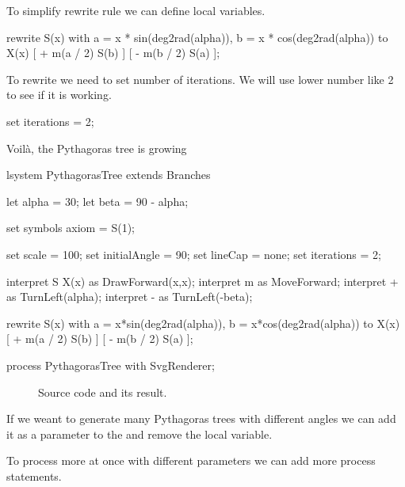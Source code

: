 To simplify rewrite rule we can define local variables.

\begin{Lsystem}
rewrite S(x)
	with a = x * sin(deg2rad(alpha)), b = x * cos(deg2rad(alpha))
	to X(x) [ + m(a / 2) S(b) ] [ - m(b / 2) S(a) ];
\end{Lsystem}

To rewrite \lsystem we need to set number of iterations.
We will use lower number like 2 to see if it is working.

\begin{Lsystem}
set iterations = 2;
\end{Lsystem}

Voilà, the Pythagoras tree is growing

\newsavebox{\lstBoxUserDocC}
\begin{lrbox}{\lstBoxUserDocC}
\begin{Lsystem60}
lsystem PythagorasTree extends Branches{
	let alpha = 30;
	let beta = 90 - alpha;

	set symbols axiom = S(1);
	
	set scale = 100;
	set initialAngle = 90;
	set lineCap = none;
	set iterations = 2;
	
	interpret S X(x) as DrawForward(x,x);
	interpret m as MoveForward;
	interpret + as TurnLeft(alpha);
	interpret - as TurnLeft(-beta);
	
	rewrite S(x)
		with a = x*sin(deg2rad(alpha)),
			b = x*cos(deg2rad(alpha))
		to X(x) [ + m(a / 2) S(b) ]
			[ - m(b / 2) S(a) ];
}
process PythagorasTree with SvgRenderer;
\end{Lsystem60}
\end{lrbox}

\begin{figure}[h!]
	\subfloat{
		\usebox{\lstBoxUserDocC}
	} \hfill
	\caption{Source code and its result.}
	\label{fig:userDoc3}
\end{figure}

If we weant to generate many Pythagoras trees with different angles we can add it as a parameter to the \lsystem and remove the local variable.

\begin{Lsystem}
lsystem PythagorasTree(alpha = 30) extends Branches{
\end{Lsystem}

To process more \lsystems at once with different parameters we can add more process statements.

